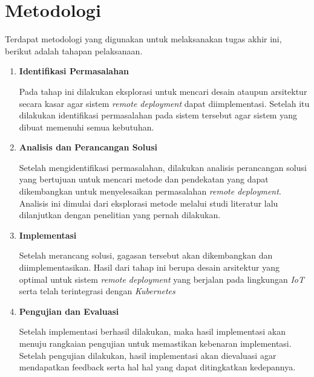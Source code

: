 \section{Metodologi}

Terdapat metodologi yang digunakan untuk melaksanakan tugas akhir ini, berikut adalah tahapan pelaksanaan.
\begin{enumerate}
  \item \textbf{Identifikasi Permasalahan}

        Pada tahap ini dilakukan eksplorasi untuk mencari desain ataupun arsitektur secara kasar agar sistem \textit{remote deployment} dapat diimplementasi. Setelah itu dilakukan identifikasi permasalahan pada sistem tersebut agar sistem yang dibuat memenuhi semua kebutuhan.

  \item \textbf{Analisis dan Perancangan Solusi}

        Setelah mengidentifikasi permasalahan, dilakukan analisis perancangan solusi yang bertujuan untuk mencari metode dan pendekatan yang dapat dikembangkan untuk menyelesaikan permasalahan \textit{remote deployment}. Analisis ini dimulai dari eksplorasi metode melalui studi literatur lalu dilanjutkan dengan penelitian yang pernah dilakukan.

  \item \textbf{Implementasi}

        Setelah merancang solusi, gagasan tersebut akan dikembangkan dan diimplementasikan. Hasil dari tahap ini berupa desain arsitektur yang optimal untuk sistem \textit{remote deployment} yang berjalan pada lingkungan \textit{IoT} serta telah terintegrasi dengan \textit{Kubernetes}

  \item \textbf{Pengujian dan Evaluasi}

        Setelah implementasi berhasil dilakukan, maka hasil implementasi akan menuju rangkaian pengujian untuk memastikan kebenaran implementasi. Setelah pengujian dilakukan, hasil implementasi akan dievaluasi agar mendapatkan feedback serta hal hal yang dapat ditingkatkan kedepannya.

\end{enumerate}